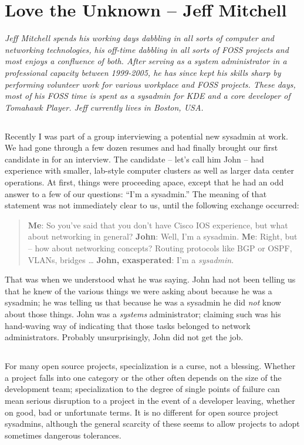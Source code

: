 \chapter{Love the Unknown -- Jeff Mitchell}

\textit{Jeff Mitchell spends his working days dabbling in all sorts of computer 
and networking technologies, his off-time dabbling in all sorts of FOSS projects 
and most enjoys a confluence of both. After serving as a system administrator in a 
professional capacity between 1999-2005, he has since kept his skills sharp by 
performing volunteer work for various workplace and FOSS projects. These days, 
most of his FOSS time is spent as a sysadmin for KDE and a core developer of 
Tomahawk Player. Jeff currently lives in Boston, USA.}

\section*{}Recently I was part of a group interviewing a potential new sysadmin at
work. We had gone through a few dozen resumes and had finally brought our first
candidate in for an interview. The candidate -- let’s call him John -- had
experience with smaller, lab-style computer clusters as well as larger data
center operations. At first, things were proceeding apace, except that he had an
odd answer to a few of our questions: ``I’m a sysadmin.''
The meaning of that statement was not immediately clear to us, until the
following exchange occurred:
\begin{quote}
\textbf{Me}: So you’ve said that you don’t have Cisco IOS experience, but what about
networking in general?\newline
\textbf{John}: Well, I’m a sysadmin.\newline
\textbf{Me}: Right, but -- how about networking concepts? Routing protocols like BGP or
OSPF, VLANs, bridges \dots \newline
\textbf{John, exasperated}: I’m a \emph{sysadmin}.
\end{quote}
That was when we understood what he was saying. John had not been telling us that he knew
of the various things we were asking about because he was a sysadmin; he was
telling us that because he was a sysadmin he did \emph{not} know about those things.
John was a \emph{systems} administrator; claiming such was his hand-waving way of
indicating that those tasks belonged to network administrators.
Probably unsurprisingly, John did not get the job.

\section*{}For many open source projects, specialization is a curse, not a blessing.
Whether a project falls into one category or the other often depends on the size
of the development team; specialization to the degree of single points of
failure can mean serious disruption to a project in the event of a developer
leaving, whether on good, bad or unfortunate terms. It is no different for open
source project sysadmins, although the general scarcity of these seems to allow
projects to adopt sometimes dangerous tolerances.

